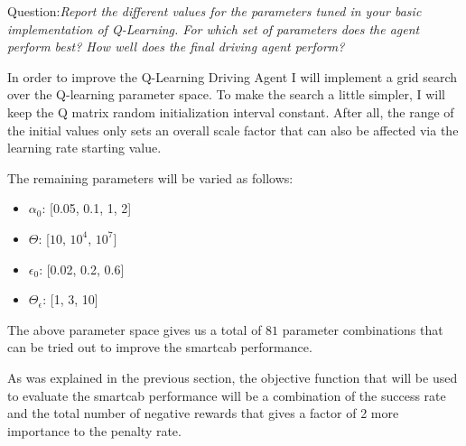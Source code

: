 \documentclass[conference]{IEEEtran}
\begin{document}
\vspace{1em} \noindent Question:\textit{Report the different values for the
parameters tuned in your basic implementation of Q-Learning. For which set of
parameters does the agent perform best? How well does the final driving agent
perform?}

\vspace{2em}
In order to improve the Q-Learning Driving Agent I will implement a grid search
over the Q-learning parameter space.  To make the search a little simpler, I
will keep the Q matrix random initialization interval constant.  After all, the
range of the initial values only sets an overall scale factor that can also be
affected via the learning rate starting value.  

The remaining parameters will be varied as follows:

\begin{itemize}
    \item $\alpha_{0}$:  [0.05, 0.1, 1, 2]

    \item $\Theta$:  [$10$, $10^4$, $10^7$]

    \item $\epsilon_{0}$: [0.02, 0.2, 0.6]

    \item $\Theta_{\epsilon}$: [1, 3, 10]
\end{itemize}

The above parameter space gives us a total of $81$ parameter
combinations that can be tried out to improve the smartcab performance. 

As was explained in the previous section, the objective function that will be
used to evaluate the smartcab performance will be a combination of the success
rate and the total number of negative rewards that gives a factor of 2 more
importance to the penalty rate.
\end{document}
